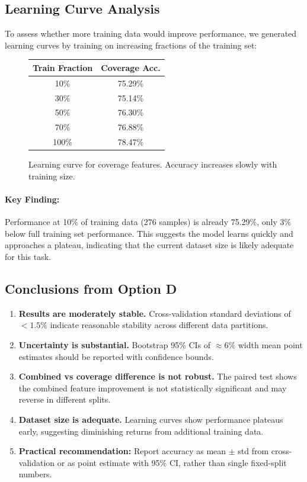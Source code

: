 \documentclass[12pt,a4paper]{article}
\begin{document}
\subsection{Learning Curve Analysis}

To assess whether more training data would improve performance, we generated learning curves
by training on increasing fractions of the training set:

\begin{figure}[h]
\centering
\begin{tabular}{cc}
\textbf{Train Fraction} & \textbf{Coverage Acc.} \\
\hline
10\% & 75.29\% \\
30\% & 75.14\% \\
50\% & 76.30\% \\
70\% & 76.88\% \\
100\% & 78.47\% \\
\end{tabular}
\caption{Learning curve for coverage features. Accuracy increases slowly with training size.}
\label{tab:learning_curve}
\end{figure}

\paragraph{Key Finding:} Performance at 10\% of training data (276 samples) is already 75.29\%,
only 3\% below full training set performance. This suggests the model learns quickly and
approaches a plateau, indicating that the current dataset size is likely adequate for this task.

\subsection{Conclusions from Option D}

\begin{enumerate}
\item \textbf{Results are moderately stable.} Cross-validation standard deviations of $<1.5\%$
indicate reasonable stability across different data partitions.

\item \textbf{Uncertainty is substantial.} Bootstrap 95\% CIs of $\approx6\%$ width mean
point estimates should be reported with confidence bounds.

\item \textbf{Combined vs coverage difference is not robust.} The paired test shows the
combined feature improvement is not statistically significant and may reverse in different splits.

\item \textbf{Dataset size is adequate.} Learning curves show performance plateaus early,
suggesting diminishing returns from additional training data.

\item \textbf{Practical recommendation:} Report accuracy as mean $\pm$ std from cross-validation
or as point estimate with 95\% CI, rather than single fixed-split numbers.
\end{enumerate}
\end{document}
